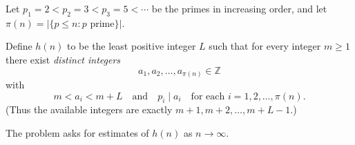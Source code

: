 Let $p_1=2<p_2=3<p_3=5<\cdots$ be the primes in increasing order, and let $\pi(n)=|\{p\le n : p\text{ prime}\}|$.

Define $h(n)$ to be the least positive integer $L$ such that for every integer $m\ge 1$ there exist \emph{distinct integers}
\[
a_1,a_2,\dots,a_{\pi(n)}\in\mathbb Z
\]
with
\[
 m < a_i < m+L\quad\text{and}\quad p_i\mid a_i\quad\text{for each }i=1,2,\dots,\pi(n).
\]
(Thus the available integers are exactly $m+1, m+2,\dots,m+L-1$.)

The problem asks for estimates of $h(n)$ as $n\to\infty$.
